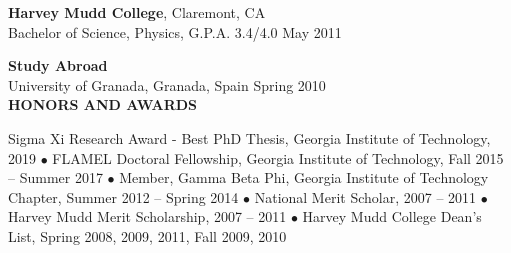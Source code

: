 \documentclass[10pt]{article}
\newenvironment{changemargin}[2]{%
  \list{}{\rightmargin#2\leftmargin#1
    \parsep=0pt\topsep=1pt\partopsep=0pt}
\item[]} {\endlist}
\newenvironment{indentmore}{\begin{changemargin}{10pt}{0cm}}{\end{changemargin}}
\begin{document}
\vspace{10pt}

\textbf{Harvey Mudd College}, Claremont, CA \\
\hspace*{10pt}Bachelor of Science, Physics, G.P.A. 3.4/4.0 \hfill May 2011

\vspace{5pt}
\textbf{Study Abroad} \\
\hspace*{10pt}University of Granada, Granada, Spain \hfill Spring 2010\\


\textbf{\large HONORS AND AWARDS}
\begin{indentmore}

Sigma Xi Research Award - Best PhD Thesis, Georgia Institute of Technology, 2019 $\bullet$ FLAMEL Doctoral Fellowship, Georgia Institute of Technology, Fall 2015 -- Summer 2017 $\bullet$  Member, Gamma Beta Phi, Georgia Institute of Technology Chapter, Summer 2012 -- Spring 2014 $\bullet$ National Merit Scholar, 2007 -- 2011 $\bullet$ Harvey Mudd Merit Scholarship, 2007 -- 2011 $\bullet$ Harvey Mudd College Dean's List, Spring 2008, 2009, 2011, Fall 2009, 2010
\end{indentmore}
\end{document}
